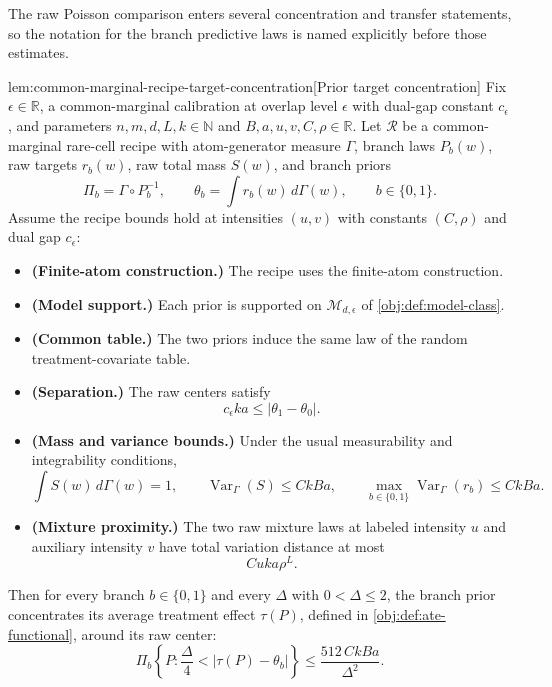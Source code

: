 \documentclass[11pt]{article}
\begin{document}
The raw Poisson comparison enters several concentration and transfer statements, so the notation for the branch predictive laws is named explicitly before those estimates.

\begin{lemmav}{lem:common-marginal-recipe-target-concentration}[Prior target concentration]
Fix \(\epsilon\in\mathbb R\), a common-marginal calibration at overlap level \(\epsilon\) with dual-gap constant \(c_\epsilon\), and parameters \(n,m,d,L,k\in\mathbb N\) and \(B,a,u,v,C,\rho\in\mathbb R\).  Let \(\mathcal R\) be a common-marginal rare-cell recipe with atom-generator measure \(\Gamma\), branch laws \(P_b(w)\), raw targets \(r_b(w)\), raw total mass \(S(w)\), and branch priors
\[
\Pi_b=\Gamma\circ P_b^{-1},
\qquad
\theta_b=\int r_b(w)\,d\Gamma(w),
\qquad b\in\{0,1\}.
\]
Assume the recipe bounds hold at intensities \((u,v)\) with constants \((C,\rho)\) and dual gap \(c_\epsilon\):
\begin{itemize}
\item \textbf{(Finite-atom construction.)}  The recipe uses the finite-atom construction.
\item \textbf{(Model support.)}  Each prior is supported on \(\mathcal M_{d,\epsilon}\) of \cref{obj:def:model-class}.
\item \textbf{(Common table.)}  The two priors induce the same law of the random treatment-covariate table.
\item \textbf{(Separation.)}  The raw centers satisfy
\[
c_\epsilon k a\le |\theta_1-\theta_0|.
\]
\item \textbf{(Mass and variance bounds.)}  Under the usual measurability and integrability conditions,
\[
\int S(w)\,d\Gamma(w)=1,\qquad
\operatorname{Var}_\Gamma(S)\le CkBa,\qquad
\max_{b\in\{0,1\}}\operatorname{Var}_\Gamma(r_b)\le CkBa.
\]
\item \textbf{(Mixture proximity.)}  The two raw mixture laws at labeled intensity \(u\) and auxiliary intensity \(v\) have total variation distance at most
\[
Cuka\rho^L.
\]
\end{itemize}
Then for every branch \(b\in\{0,1\}\) and every \(\Delta\) with \(0<\Delta\le2\), the branch prior concentrates its average treatment effect \(\tau(P)\), defined in \cref{obj:def:ate-functional}, around its raw center:
\[
\Pi_b\!\left\{P:\frac{\Delta}{4}<|\tau(P)-\theta_b|\right\}
\le
\frac{512\,CkBa}{\Delta^2}.
\]
\end{lemmav}
\end{document}
